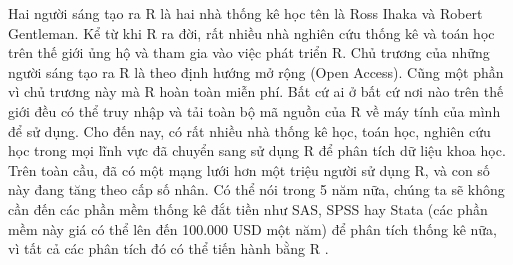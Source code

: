 \documentclass[12pt, a4paper,oneside]{book}
\theoremstyle{definition}
\begin{document}
Hai người sáng tạo ra R là hai nhà thống kê học tên là Ross Ihaka và Robert Gentleman. Kể từ khi R ra đời, rất nhiều nhà nghiên cứu thống kê và toán học trên thế giới ủng hộ và tham gia vào việc phát triển R. Chủ trương của những người sáng tạo ra R là theo định hướng mở rộng (Open Access). Cũng một phần vì chủ trương này mà R hoàn toàn miễn phí. Bất cứ ai ở bất cứ nơi nào trên thế giới đều có thể truy nhập và tải toàn bộ mã nguồn của R về máy tính của mình để sử dụng. Cho đến nay, có rất nhiều nhà thống kê học, toán học, nghiên cứu học trong mọi lĩnh vực đã chuyển sang sử dụng R để phân tích dữ liệu khoa học. Trên toàn cầu, đã có một mạng lưới hơn một triệu người sử dụng R, và con số này đang tăng theo cấp số nhân. Có thể nói trong 5 năm nữa, chúng ta sẽ không cần đến các phần mềm thống kê đắt tiền như SAS, SPSS hay Stata (các phần mềm này giá có thể lên đến 100.000 USD một năm) để phân tích thống kê nữa, vì tất cả các phân tích đó có thể tiến hành bằng R \cite{13, 14}.
\end{document}
